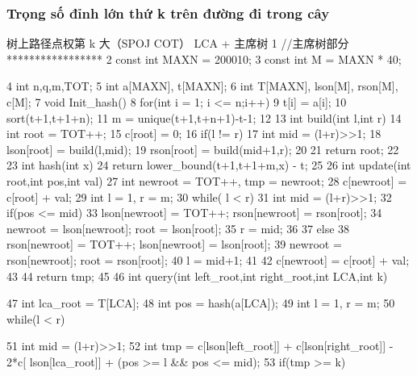 \documentclass[11pt]{article}
\begin{document}
\subsubsection{Trọng số đỉnh lớn thứ k trên đường đi trong cây}

\begin{Code}
     树上路径点权第 k 大（SPOJ COT）
     LCA + 主席树
1 //主席树部分 *****************
2 const int MAXN = 200010;
3 const int M = MAXN * 40;


 4 int n,q,m,TOT;
 5 int a[MAXN], t[MAXN];
 6 int T[MAXN], lson[M], rson[M], c[M];
 7 void Init_hash(){
 8     for(int i = 1; i <= n;i++)
 9         t[i] = a[i];
10     sort(t+1,t+1+n);
11     m = unique(t+1,t+n+1)-t-1;
12 }
13 int build(int l,int r){
14     int root = TOT++;
15     c[root] = 0;
16     if(l != r){
17         int mid = (l+r)>>1;
18         lson[root] = build(l,mid);
19         rson[root] = build(mid+1,r);
20     }
21     return root;
22 }
23 int hash(int x){
24     return lower_bound(t+1,t+1+m,x) - t;
25 }
26 int update(int root,int pos,int val){
27     int newroot = TOT++, tmp = newroot;
28     c[newroot] = c[root] + val;
29     int l = 1, r = m;
30     while( l < r){
31         int mid = (l+r)>>1;
32         if(pos <= mid){
33             lson[newroot] = TOT++; rson[newroot] = rson[root];
34             newroot = lson[newroot]; root = lson[root];
35             r = mid;
36         }
37         else{
38             rson[newroot] = TOT++; lson[newroot] = lson[root];
39             newroot = rson[newroot]; root = rson[root];
40             l = mid+1;
41         }
42         c[newroot] = c[root] + val;
43     }
44     return tmp;
45 }
46 int query(int left_root,int right_root,int LCA,int k){
47     int lca_root = T[LCA];
48     int pos = hash(a[LCA]);
49     int l = 1, r = m;
50     while(l < r){
51         int mid = (l+r)>>1;
52         int tmp = c[lson[left_root]] + c[lson[right_root]] - 2*c[
              lson[lca_root]] + (pos >= l && pos <= mid);
53         if(tmp >= k){


}}}
\end{Code}
\end{document}
